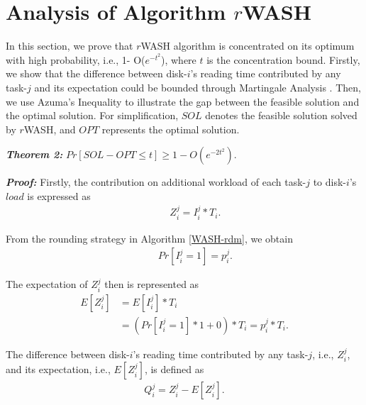 \documentclass[conference]{IEEEtran}
\begin{document}
\section{Analysis of Algorithm $r$WASH}\label{Analysis}

In this section, we prove that $r$WASH algorithm is concentrated on its optimum with high probability, i.e., 1- O($e^{-t^2}$), where $t$ is the concentration bound. Firstly, we show that the difference between disk-$i$'s reading time contributed by any task-$j$ and its expectation could be bounded through Martingale Analysis \cite{b12}. Then, we use Azuma's Inequality to illustrate the gap between the feasible solution and the optimal solution. For simplification, $SOL$ denotes the feasible solution solved by $r$WASH, and $OPT$ represents the optimal solution.

\vspace{0.2cm}
\emph{\textbf{Theorem 2:}} $Pr[SOL - OPT\leq t] \geq 1 - O(e^{-2t^2})$.

\emph{\textbf{Proof:}} Firstly, the contribution on additional workload of each task-$j$ to disk-$i$'s $load$ is expressed as
\vspace{-0.1cm}
 \begin{align}
&\;\;\;\;\;Z_i^j = I_i^j*T_i.
\end{align}

\vspace{-0.2cm}
From the rounding strategy in Algorithm \ref{WASH-rdm}, we obtain
 \vspace{-0.2cm}
 \begin{align}
&\;\;\;\;\;Pr[I_i^j = 1] = p_i^j. \nonumber
\end{align}

\vspace{-0.2cm}
The expectation of $Z_i^j$ then is represented as
\vspace{-0.2cm}
\begin{align}
E[Z_i^j] &= E[I_i^j]*T_i \nonumber\\
&= (Pr[I_i^j = 1] * 1 +  0)*T_i = p_i^j*T_i.\label{prove:expect}
\end{align}

\vspace{-0.2cm}
The difference between disk-$i$'s reading time contributed by any task-$j$, i.e., $Z_i^j$, and its expectation, i.e., $E[Z_i^j]$, is defined as
 \vspace{-0.1cm}
\begin{align}
Q_i^j = Z_i^j - E[Z_i^j].\label{prove:diff}
\end{align}
\end{document}
